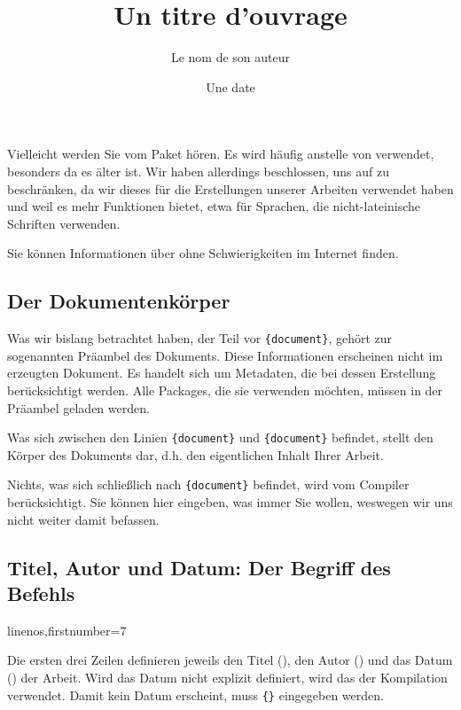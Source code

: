\begin{plusloins}
Vielleicht werden Sie vom Paket  hören. Es wird häufig anstelle von  verwendet, besonders da es älter ist. Wir haben allerdings beschlossen, uns auf  zu beschränken, da wir dieses für die Erstellungen unserer Arbeiten verwendet haben und weil es mehr Funktionen bietet, etwa für Sprachen, die nicht-lateinische Schriften verwenden.

Sie können Informationen über  ohne Schwierigkeiten im Internet finden.
\end{plusloins}

\subsection{Der Dokumentenkörper}

Was wir bislang betrachtet haben, der Teil vor \verb|{document}|, gehört zur sogenannten Präambel des Dokuments.\label{preambule} Diese Informationen erscheinen nicht im erzeugten Dokument. Es handelt sich um Metadaten, die bei dessen Erstellung berücksichtigt werden. Alle Packages, die sie verwenden möchten, müssen in der Präambel geladen werden.

Was sich zwischen den Linien  \verb|{document}| und \verb|{document}| befindet, stellt den Körper des Dokuments dar, d.h. den eigentlichen Inhalt Ihrer Arbeit.

Nichts, was sich schließlich nach \verb|{document}| befindet, wird vom Compiler berücksichtigt. Sie können hier eingeben, was immer Sie wollen, weswegen wir uns nicht weiter damit befassen.

\subsection{Titel, Autor und Datum: Der Begriff des Befehls}\label{notioncommande}

\begin{latexcode*}{linenos,firstnumber=7}
\title{Un titre d'ouvrage}
\author{Le nom de son auteur}
\date{Une date}
\maketitle
\end{latexcode*}

Die ersten drei Zeilen definieren jeweils den Titel (), den Autor () und das Datum () der Arbeit. Wird das Datum nicht explizit definiert, wird das der Kompilation verwendet. Damit kein Datum erscheint, muss  \verb|{}| eingegeben werden.


